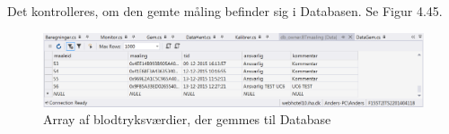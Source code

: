 Det kontrolleres, om den gemte måling befinder sig i Databasen. Se Figur 4.45.

\begin{figure}[H]
	\centering
	\includegraphics[width=1\textwidth]{Figurer/UC6_Database2}
	\caption{Array af blodtryksværdier, der gemmes til Database}
\end{figure}





